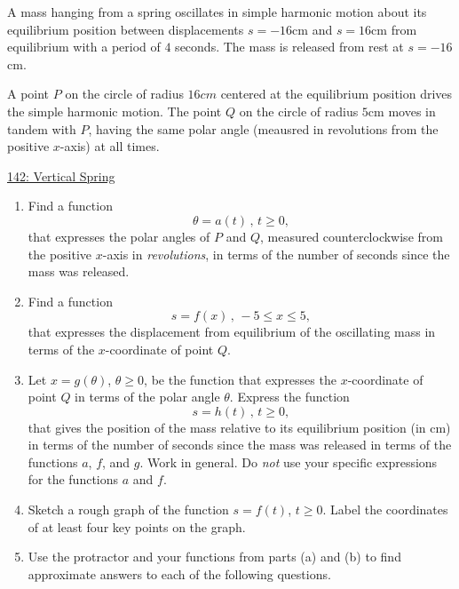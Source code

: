 \documentclass{ximera}
\begin{document}
\begin{question} \label{Qpdf30r3mmm}

A mass hanging from a spring oscillates in simple harmonic motion about its equilibrium position between displacements $s=-16$cm and $s=16$cm from equilibrium with a period of $4$ seconds. The mass is released from rest at $s=-16$cm.

A point $P$ on the circle of radius $16cm$ centered at the equilibrium position drives the simple harmonic motion. The point $Q$ on the circle of radius $5$cm moves in tandem with $P$, having the same polar angle (meausred in revolutions from the positive $x$-axis) at all times. 

\begin{onlineOnly}
    \begin{center}
\end{center}
\end{onlineOnly}

\href{https://www.desmos.com/calculator/tskmnyezxz}{142: Vertical Spring}

\begin{enumerate}
\item Find a function 
\[
    \theta = a(t) \, , \, t \geq 0 ,
\]
that expresses the polar angles of $P$ and $Q$, measured counterclockwise from the positive $x$-axis in \emph{revolutions}, in terms of the number of seconds since the mass was released.

\item Find a function
\[
    s = f(x) \, , \, -5 \leq x \leq 5 ,
\]
that expresses the displacement from equilibrium of the oscillating mass in terms of the $x$-coordinate of point $Q$.

\item Let $x = g(\theta)$, $\theta \geq 0$, be the function that expresses the $x$-coordinate of point $Q$ in terms of the polar angle $\theta$. Express the function
\[
   s = h(t) \, , \, t\geq 0,
\]
that gives the position of the mass relative to its equilibrium position (in cm) in terms of the number of seconds since the mass was released in terms of the functions $a$, $f$, and $g$. Work in general. Do \emph{not} use your specific expressions for the functions $a$ and $f$.

\item Sketch a rough graph of the function $s=f(t)$, $t\geq 0$. Label the coordinates of at least four key points on the graph.

\item Use the protractor and your functions from parts (a) and (b) to find approximate answers to each of the following questions.


\end{enumerate}
\end{question}
\end{document}
